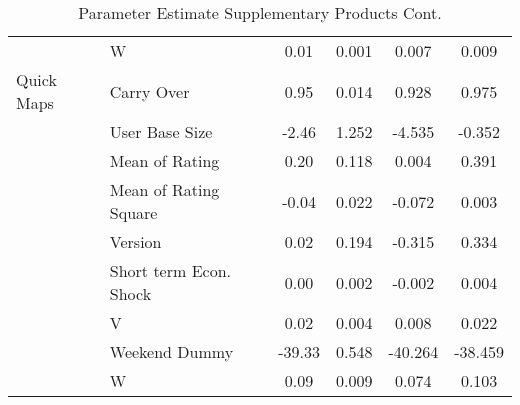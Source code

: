 \documentclass[mksc,nonblindrev]{informs3}
\begin{document}
\begin{table}
\begin{tabular}{llcccc}
	&	W	&	0.01	&	0.001	&	0.007	&	0.009	\\
Quick Maps	&	Carry Over	&	0.95	&	0.014	&	0.928	&	0.975	\\
	&	User Base Size	&	-2.46	&	1.252	&	-4.535	&	-0.352	\\
	&	Mean of Rating	&	0.20	&	0.118	&	0.004	&	0.391	\\
	&	Mean of Rating Square	&	-0.04	&	0.022	&	-0.072	&	0.003	\\
	&	Version	&	0.02	&	0.194	&	-0.315	&	0.334	\\
	&	Short term Econ. Shock	&	0.00	&	0.002	&	-0.002	&	0.004	\\
	&	V	&	0.02	&	0.004	&	0.008	&	0.022	\\
	&	Weekend Dummy	&	-39.33	&	0.548	&	-40.264	&	-38.459	\\
	&	W	&	0.09	&	0.009	&	0.074	&	0.103	\\ \hline
		\end{tabular}
	\caption{Parameter Estimate Supplementary Products Cont.}
	\label{tab:ParameterEstimateSupplementaryProducts}
\end{table}



%
%
%



\end{document}
